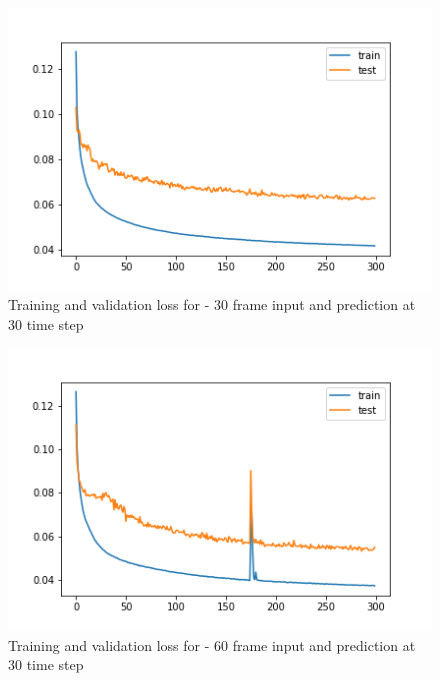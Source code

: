 \begin{figure}[H] 
\includegraphics[scale=0.8]{conf10_300e_30ffuture}
\begin{center}
\caption{Training and validation loss for - 30 frame input and prediction at 30 time step }
\label{30-30}
\end{center}
\end{figure}

\begin{figure}[H] 
\includegraphics[scale=0.8]{conf11_300e_60_30ffuture}
\begin{center}
\caption{Training and validation loss for - 60 frame input and prediction at 30 time step }
\label{60-30}
\end{center}
\end{figure}


